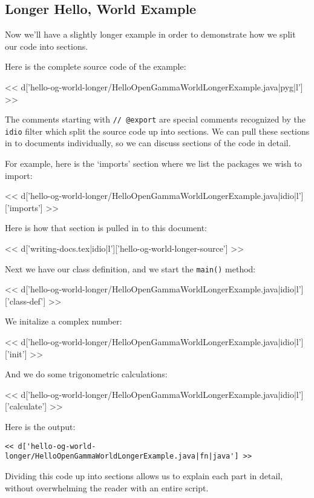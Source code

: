 \subsection{Longer Hello, World Example}

Now we'll have a slightly longer example in order to demonstrate how we split
our code into sections.

Here is the complete source code of the example:

<< d['hello-og-world-longer/HelloOpenGammaWorldLongerExample.java|pyg|l'] >>

The comments starting with \verb|// @export| are special comments recognized
by the \verb|idio| filter which split the source code up into sections. We can
pull these sections in to documents individually, so we can discuss sections of
the code in detail.

For example, here is the `imports' section where we list the packages we wish to import:

<< d['hello-og-world-longer/HelloOpenGammaWorldLongerExample.java|idio|l']['imports'] >>

Here is how that section is pulled in to this document:

<< d['writing-docs.tex|idio|l']['hello-og-world-longer-source'] >>

Next we have our class definition, and we start the \verb|main()| method:

<< d['hello-og-world-longer/HelloOpenGammaWorldLongerExample.java|idio|l']['class-def'] >>

We initalize a complex number:

<< d['hello-og-world-longer/HelloOpenGammaWorldLongerExample.java|idio|l']['init'] >>

And we do some trigonometric calculations:

<< d['hello-og-world-longer/HelloOpenGammaWorldLongerExample.java|idio|l']['calculate'] >>

Here is the output:

\begin{Verbatim}
<< d['hello-og-world-longer/HelloOpenGammaWorldLongerExample.java|fn|java'] >>
\end{Verbatim}

Dividing this code up into sections allows us to explain each part in detail,
without overwhelming the reader with an entire script.

